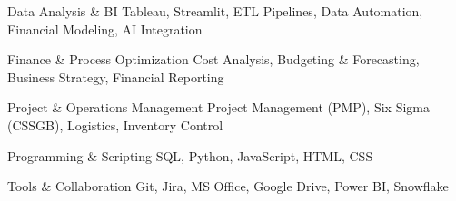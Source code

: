 

\begin{cvskills}

\cvskill
    {Data Analysis \& BI} %
    {Tableau, Streamlit, ETL Pipelines, Data Automation, Financial Modeling, AI Integration} %

\cvskill
    {Finance \& Process Optimization} %
    {Cost Analysis, Budgeting \& Forecasting, Business Strategy, Financial Reporting} %

\cvskill
    {Project \& Operations Management} %
    {Project Management (PMP), Six Sigma (CSSGB), Logistics, Inventory Control} %

\cvskill
    {Programming \& Scripting} %
    {SQL, Python, JavaScript, HTML, CSS} %

\cvskill
    {Tools \& Collaboration} %
    {Git, Jira, MS Office, Google Drive, Power BI, Snowflake} %


\end{cvskills}